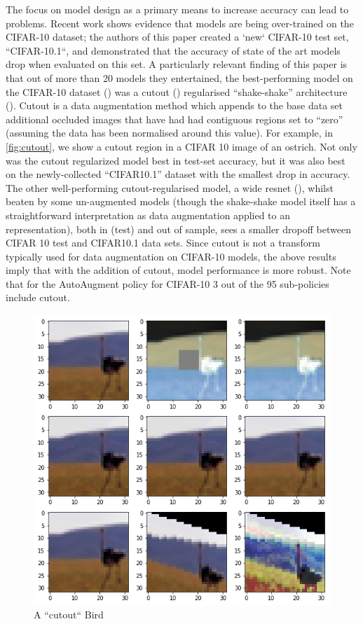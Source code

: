 \documentclass[10pt,twocolumn,letterpaper]{article}
\begin{document}
	The focus on model design as a primary means to increase accuracy can lead to problems. Recent work shows evidence that models are being over-trained on the CIFAR-10 dataset\cite{Recht2018}; the authors of this paper created a `new` CIFAR-10 test set, ``CIFAR-10.1``, and demonstrated that the accuracy of state of the art models drop when evaluated on this set. A particularly relevant finding of this paper is that out of more than 20 models they entertained, the best-performing model on the CIFAR-10 dataset (\cite{Krizhevsk2009}) was a cutout (\cite{Devries2017}) regularised ``shake-shake'' architecture (\cite{Gastaldi2017}). Cutout is a data augmentation method which appends to the base data set additional occluded images that have had had contiguous regions set to ``zero'' (assuming the data has been normalised around this value). For example, in \autoref{fig:cutout}, we show a cutout region in a CIFAR 10 image of an ostrich. Not only was the cutout regularized model best in test-set accuracy, but it was also best on the newly-collected ``CIFAR10.1'' dataset with the smallest drop in accuracy. The other well-performing cutout-regularised model, a wide resnet (\cite{Zagoruyko2016}), whilst beaten by some un-augmented models (though the shake-shake model itself has a straightforward interpretation as data augmentation applied to an representation), both in (test) and out of sample, sees a smaller dropoff between CIFAR 10 test and CIFAR10.1 data sets. Since cutout is not a transform typically used for data augmentation on CIFAR-10 models, the above results imply that with the addition of cutout, model performance is more robust. Note that for the AutoAugment policy for CIFAR-10 3 out of the 95 sub-policies include cutout.
	 


	

	\begin{figure}[t]
	\begin{center}
	   \includegraphics[trim={6.5cm 12.5cm 6.5cm 0}, clip, width=0.8\linewidth]{image.png}
	\end{center}
	   \caption{A ``cutout`` Bird}
	\label{fig:cutout}
	\end{figure}
	
\end{document}
